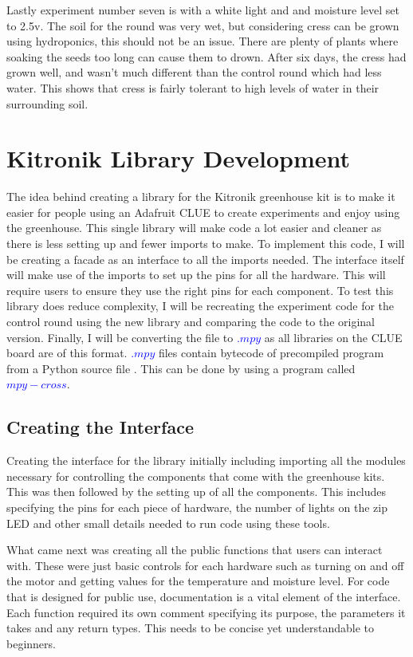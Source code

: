 Lastly experiment number seven is with a white light and and moisture level set to 2.5v. The soil for the round was very wet, but considering cress can be grown using hydroponics, this should not be an issue. There are plenty of plants where soaking the seeds too long can cause them to drown. After six days, the cress had grown well, and wasn't much different than the control round which had less water. This shows that cress is fairly tolerant to high levels of water in their surrounding soil.


\section{Kitronik Library Development}

The idea behind creating a library for the Kitronik greenhouse kit is to make it easier for people using an Adafruit CLUE to create experiments and enjoy using the greenhouse. This single library will make code a lot easier and cleaner as there is less setting up and fewer imports to make. To implement this code, I will be creating a facade as an interface to all the imports needed. The interface itself will make use of the imports to set up the pins for all the hardware. This will require users to ensure they use the right pins for each component. To test this library does reduce complexity, I will be recreating the experiment code for the control round using the new library and comparing the code to the original version. Finally, I will be converting the file to \textcolor{blue}{$.mpy$} as all libraries on the CLUE board are of this format. \textcolor{blue}{$.mpy$} files contain bytecode of precompiled program from a Python source file \cite{micropython}. This can be done by using a program called \textcolor{blue}{$mpy-cross$}.

\subsection{Creating the Interface}

Creating the interface for the library initially including importing all the modules necessary for controlling the components that come with the greenhouse kits. This was then followed by the setting up of all the components. This includes specifying the pins for each piece of hardware, the number of lights on the zip LED and other small details needed to run code using these tools.

What came next was creating all the public functions that users can interact with. These were just basic controls for each hardware such as turning on and off the motor and getting values for the temperature and moisture level. For code that is designed for public use, documentation is a vital element of the interface. Each function required its own comment specifying its purpose, the parameters it takes and any return types. This needs to be concise yet understandable to beginners.

